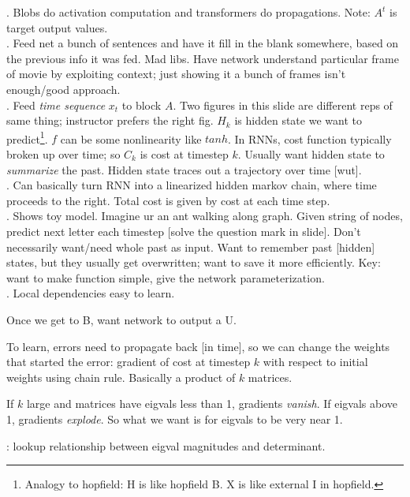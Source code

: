 \documentclass[12pt]{article}
\begin{document}
\p {}. Blobs do activation computation and transformers do propagations. Note: $A^t$ is target output values. \\

\p {}. Feed net a bunch of sentences and have it fill in the blank somewhere, based on the previous info it was fed. Mad libs. Have network understand particular frame of movie by exploiting context; just showing it a bunch of frames isn't enough/good approach. \\

\p {}. Feed \textit{time sequence} $x_t$ to block $A$. Two figures in this slide are different reps of same thing; instructor prefers the right fig. $H_k$ is hidden state we want to predict\footnote{Analogy to hopfield: H is like hopfield B. X is like external I in hopfield.}. $f$ can be some nonlinearity like $tanh$. In RNNs, cost function typically broken up over time; so $C_k$ is cost at timestep $k$. Usually want hidden state to \textit{summarize} the past. Hidden state traces out a trajectory over time [wut]. \\

\p {}. Can basically turn RNN into a linearized hidden markov chain, where time proceeds to the right. Total cost is given by cost at each time step. \\

\p {}. Shows toy model. Imagine ur an ant walking along graph. Given string of nodes, predict next letter each timestep [solve the question mark in slide]. Don't necessarily want/need whole past as input. Want to remember past [hidden] states, but they usually get overwritten; want to save it more efficiently. Key: want to make function simple, give the network parameterization. \\

\p {}. Local dependencies easy to learn. 
\begin{compactitem}[$\rightarrow$]
	\item Once we get to B, want network to output a U. 
	\item To learn, errors need to propagate back [in time], so we can change the weights that started the error: gradient of cost at timestep $k$ with respect to initial weights using chain rule. Basically a product of $k$ matrices. 
	\item If $k$ large and matrices have eigvals less than 1, gradients \textit{vanish}. If eigvals above 1, gradients \textit{explode}. So what we want is for eigvals to be very near 1. 
	\item {}: lookup relationship between eigval magnitudes and determinant. 
\end{compactitem}
\end{document}
